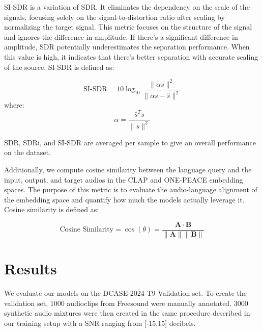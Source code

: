 \documentclass[11pt]{article}
\begin{document}
SI-SDR \cite{sdr} is a variation of SDR. It eliminates the dependency on the scale of the signals, focusing solely on the signal-to-distortion ratio after scaling by normalizing the target signal. This metric focuses on the structure of the signal and ignores the difference in amplitude. If there's a significant difference in amplitude, SDR potentially underestimates the separation performance.  When this value is high, it indicates that there’s better separation with accurate scaling of the source. SI-SDR is defined as:

\begin{equation}
    \label{sisdr_equation}
    \text{SI-SDR} = 10 \log_{10} \frac{\| \alpha s \|^2}{\| \alpha s - \hat{s} \|^2}
\end{equation}
where:
    $$ \alpha = \frac{\hat{s}^T s}{\|s\|^2} $$

\noindent SDR, SDRi, and SI-SDR are averaged per sample to give an overall performance on the dataset.

Additionally, we compute cosine similarity between the language query and the input, output, and target audios in the CLAP and ONE-PEACE embedding spaces. The purpose of this metric is to evaluate the audio-language alignment of the embedding space and quantify how much the models actually leverage it. Cosine similarity is defined as:

\begin{equation}
    \label{cosine_sim_equation}
    \text{Cosine Similarity} = \cos(\theta) = \frac{\mathbf{A} \cdot \mathbf{B}}{\|\mathbf{A}\| \|\mathbf{B}\|}
\end{equation}

\section{Results}
We evaluate our models on the DCASE 2024 T9 Validation set. To create the validation set, 1000 audioclips from Freesound \cite{freesound} were manually annotated. 3000 synthetic audio mixtures were then created in the same procedure described in our training setup with a SNR ranging from [-15,15] decibels.
\end{document}

